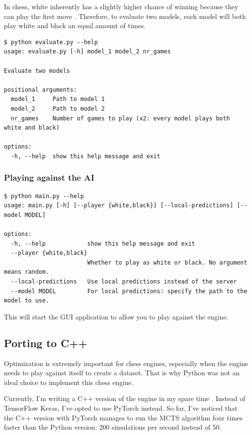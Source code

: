 \documentclass{article}
\begin{document}
In chess, white inherently has a slightly higher chance of winning because they can play the first move \cite{FirstmoveAdvantageChess2022}.
Therefore, to evaluate two models, each model will both play white and black an equal amount of times.

\begin{verbatim}
$ python evaluate.py --help
usage: evaluate.py [-h] model_1 model_2 nr_games

Evaluate two models

positional arguments:
  model_1     Path to model 1
  model_2     Path to model 2
  nr_games    Number of games to play (x2: every model plays both white and black)

options:
  -h, --help  show this help message and exit
\end{verbatim}

\subsubsection{Playing against the AI}

\begin{verbatim}
$ python main.py --help
usage: main.py [-h] [--player {white,black}] [--local-predictions] [--model MODEL]

options:
  -h, --help            show this help message and exit
  --player {white,black}
                        Whether to play as white or black. No argument means random.
  --local-predictions   Use local predictions instead of the server
  --model MODEL         For local predictions: specify the path to the model to use.
\end{verbatim}

This will start the GUI application to allow you to play against the engine. 

\subsection{Porting to C++}

Optimization is extremely important for chess engines, especially when the engine needs to play
against itself to create a dataset. That is why Python was not an ideal choice to implement this chess engine.

Currently, I'm writing a C++ version of the engine in my spare time \cite{zjefferChessdeeprlcpp2022}. 
Instead of TensorFlow Keras, I've opted to use PyTorch instead. 
So far, I've noticed that the C++ version with PyTorch manages to run the MCTS algorithm 
four times faster than the Python version: 200 simulations per second instead of 50.
\end{document}
